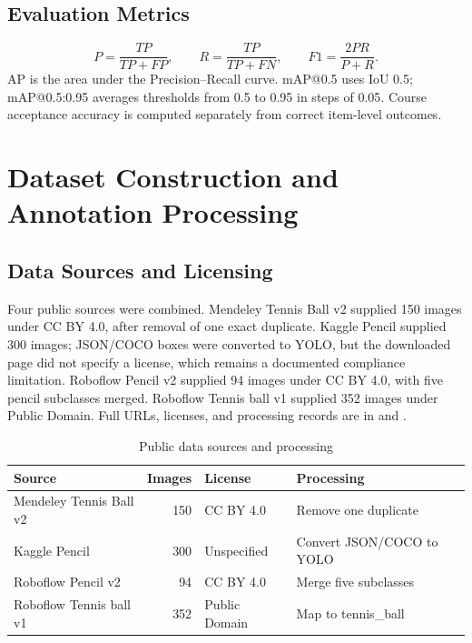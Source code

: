 \documentclass[UTF8,zihao=-4,scheme=chinese,fontset=none]{ctexart}
\begin{document}
\subsection{Evaluation Metrics}
\begin{equation}P=\frac{TP}{TP+FP},\qquad R=\frac{TP}{TP+FN},\qquad F1=\frac{2PR}{P+R}.\end{equation}
AP is the area under the Precision--Recall curve. mAP@0.5 uses IoU 0.5; mAP@0.5:0.95 averages thresholds from 0.5 to 0.95 in steps of 0.05. Course acceptance accuracy is computed separately from correct item-level outcomes.

\section{Dataset Construction and Annotation Processing}
\subsection{Data Sources and Licensing}
Four public sources were combined. Mendeley Tennis Ball v2 supplied 150 images under CC BY 4.0, after removal of one exact duplicate. Kaggle Pencil supplied 300 images; JSON/COCO boxes were converted to YOLO, but the downloaded page did not specify a license, which remains a documented compliance limitation. Roboflow Pencil v2 supplied 94 images under CC BY 4.0, with five pencil subclasses merged. Roboflow Tennis ball v1 supplied 352 images under Public Domain. Full URLs, licenses, and processing records are in  and \cite{mendeley,kagglepencil,roboflowpencil,roboflowtennis}.
\begin{table}[H]\centering\caption{Public data sources and processing}
\begin{tabularx}{\textwidth}{Y r Y Y}\toprule Source & Images & License & Processing\\\midrule
Mendeley Tennis Ball v2 & 150 & CC BY 4.0 & Remove one duplicate\\ Kaggle Pencil & 300 & Unspecified & Convert JSON/COCO to YOLO\\ Roboflow Pencil v2 & 94 & CC BY 4.0 & Merge five subclasses\\ Roboflow Tennis ball v1 & 352 & Public Domain & Map to tennis\_ball\\\bottomrule\end{tabularx}\end{table}
\end{document}
